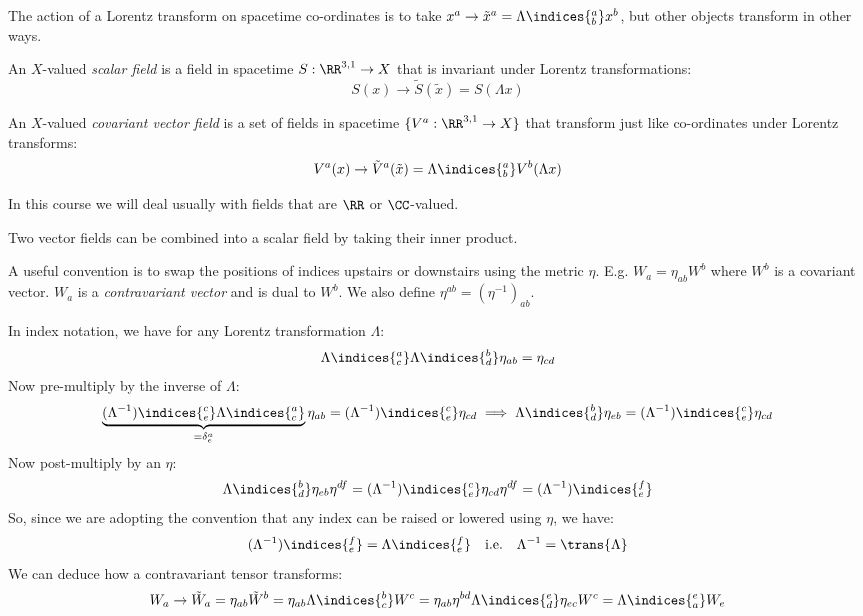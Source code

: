 \documentclass{jknotes} %
\begin{document}
The action of a Lorentz transform on spacetime co-ordinates is to take \(x^a \rightarrow \tilde{x}^a = \Lambda\indices{^a_b}x^b\), but other objects transform in other ways.

\begin{defn}
    An \(X\)-valued \emph{scalar field} is a field in spacetime \(S:\RR^{3,1}\rightarrow X\) that is invariant under Lorentz transformations:
    \begin{equation}
        S(x) \rightarrow \tilde{S}(\tilde{x}) = S(\Lambda x)
    \end{equation}
\end{defn}
\begin{defn}
    An \(X\)-valued \emph{covariant vector field} is a set of fields in spacetime \(\{V^a:\RR^{3,1}\rightarrow X\}\) that transform just like co-ordinates under Lorentz transforms:
    \begin{equation}
        V^a(x) \rightarrow \tilde{V}^a(\tilde{x}) = \Lambda\indices{^a_b}V^b(\Lambda x)
    \end{equation}
\end{defn}
In this course we will deal usually with fields that are \(\RR\) or \(\CC\)-valued.

Two vector fields can be combined into a scalar field by taking their inner product.

A useful convention is to swap the positions of indices upstairs or downstairs using the metric \(\eta\). E.g. \(W_a=\eta_{ab}W^b\) where \(W^b\) is a covariant vector. \(W_a\) is a \emph{contravariant vector} and is dual to \(W^b\). We also define \(\eta^{ab}=(\eta^{-1})_{ab}\). 

In index notation, we have for any Lorentz transformation \(\Lambda\):
\begin{equation}
    \Lambda\indices{^a_c}\Lambda\indices{^b_d}\eta_{ab}=\eta_{cd}
\end{equation}
Now pre-multiply by the inverse of \(\Lambda\):
\begin{equation}
    \underbrace{(\Lambda^{-1})\indices{^c_e}\Lambda\indices{^a_c}}_{=\delta^a_e} \eta_{ab} = (\Lambda^{-1})\indices{^c_e}\eta_{cd}
    \implies
    \Lambda\indices{^b_d} \eta_{eb} = (\Lambda^{-1})\indices{^c_e}\eta_{cd}
\end{equation}
Now post-multiply by an \(\eta\):
\begin{equation}
    \Lambda\indices{^b_d}\eta_{eb} \eta^{df} = (\Lambda^{-1})\indices{^c_e}\eta_{cd}\eta^{df} = (\Lambda^{-1})\indices{^f_e}
\end{equation}
So, since we are adopting the convention that any index can be raised or lowered using \(\eta\), we have:
\begin{equation}
    (\Lambda^{-1})\indices{^f_e}=\Lambda\indices{_e^f} \quad \text{i.e.} \quad \Lambda^{-1} = \trans{\Lambda}
\end{equation}
We can deduce how a contravariant tensor transforms:
\begin{equation}
    W_a \rightarrow \tilde{W}_a = \eta_{ab}\tilde{W}^b = \eta_{ab} \Lambda\indices{^b_c}W^c = \eta_{ab} \eta^{bd} \Lambda\indices{_d^e} \eta_{ec} W^c  = \Lambda\indices{_a^e} W_e
\end{equation}
\end{document}
